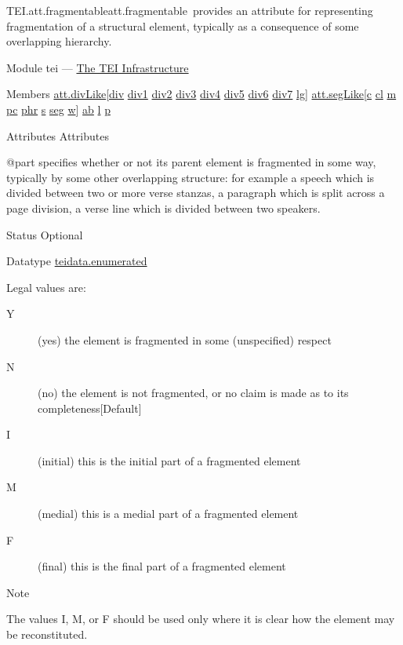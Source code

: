 \begin{reflist}
\item[]\begin{specHead}{TEI.att.fragmentable}{att.fragmentable} provides an attribute for representing fragmentation of a structural element, typically as a consequence of some overlapping hierarchy.\end{specHead} 
    \item[{Module}]
  tei — \hyperref[ST]{The TEI Infrastructure}
    \item[{Members}]
  \hyperref[TEI.att.divLike]{att.divLike}[\hyperref[TEI.div]{div} \hyperref[TEI.div1]{div1} \hyperref[TEI.div2]{div2} \hyperref[TEI.div3]{div3} \hyperref[TEI.div4]{div4} \hyperref[TEI.div5]{div5} \hyperref[TEI.div6]{div6} \hyperref[TEI.div7]{div7} \hyperref[TEI.lg]{lg}] \hyperref[TEI.att.segLike]{att.segLike}[\hyperref[TEI.c]{c} \hyperref[TEI.cl]{cl} \hyperref[TEI.m]{m} \hyperref[TEI.pc]{pc} \hyperref[TEI.phr]{phr} \hyperref[TEI.s]{s} \hyperref[TEI.seg]{seg} \hyperref[TEI.w]{w}] \hyperref[TEI.ab]{ab} \hyperref[TEI.l]{l} \hyperref[TEI.p]{p}
    \item[{Attributes}]
  Attributes\hfil\\[-10pt]\begin{sansreflist}
    \item[@part]
  specifies whether or not its parent element is fragmented in some way, typically by some other overlapping structure: for example a speech which is divided between two or more verse stanzas, a paragraph which is split across a page division, a verse line which is divided between two speakers.
\begin{reflist}
    \item[{Status}]
  Optional
    \item[{Datatype}]
  \hyperref[TEI.teidata.enumerated]{teidata.enumerated}
    \item[{Legal values are:}]
  \begin{description}

\item[{Y}](yes) the element is fragmented in some (unspecified) respect
\item[{N}](no) the element is not fragmented, or no claim is made as to its completeness{[Default] }
\item[{I}](initial) this is the initial part of a fragmented element
\item[{M}](medial) this is a medial part of a fragmented element
\item[{F}](final) this is the final part of a fragmented element
\end{description} 
    \item[{Note}]
  \par
The values I, M, or F should be used only where it is clear how the element may be reconstituted.
\end{reflist}  
\end{sansreflist}  
\end{reflist}  
